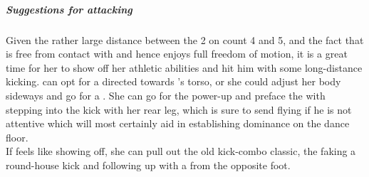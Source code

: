 \subparagraph*{Suggestions for attacking}
Given the rather large distance between the 2 on count 4 and 5, and the fact that \gal is free from contact with \dude and hence enjoys full freedom of motion, it is a great time for her to show off her athletic abilities and hit him with some long-distance kicking. \gal can opt for a \atttrykker directed towards \dude's torso, or she could adjust her body sideways and go for a \attsidetrykker. She can go for the power-up and preface the \attsidetrykker with stepping into the kick with her rear leg, which is sure to send \dude flying if he is not attentive which will most certainly aid \gal in establishing dominance on the dance floor.\\
If \gal feels like showing off, she can pull out the old kick-combo classic, the \attfootjuglar faking a round-house kick and following up with a \atthestehilsen from the opposite foot.  
